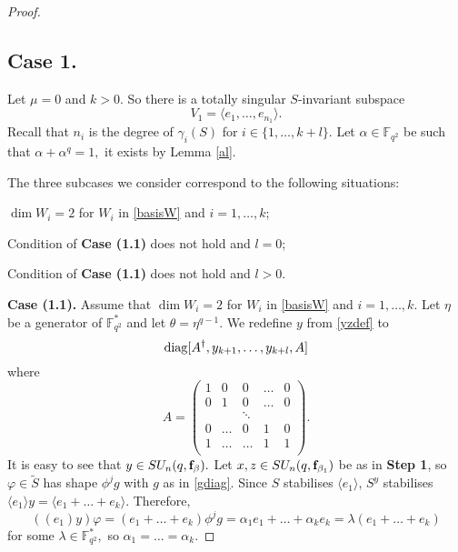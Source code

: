 \begin{proof}
\subsection*{Case 1.} Let $\mu=0$  and $k>0.$ So there is a totally singular $S$-invariant subspace 
$$V_1=\langle e_1, \ldots, e_{n_1} \rangle.$$
Recall that $n_i$ is the degree of $\gamma_i(S)$ for $i \in \{1, \ldots, k+l\}.$ Let $\alpha \in \mathbb{F}_{q^2}$ be such that  
$\alpha+\alpha^q=1,$ it exists by Lemma \ref{al}.

\medskip


The three subcases we consider correspond to the following situations:
\begin{description}[before={\renewcommand\makelabel[1]{\bfseries ##1}}]
\item[{\bf Case (1.1)}] $\dim W_i=2$ for $W_i$ in \eqref{basisW} and $i=1, \ldots, k$;
\item[{\bf Case (1.2)}] Condition of {\bf Case (1.1)} does not hold and $l=0$;
\item[{\bf Case (1.3)}] Condition of {\bf Case (1.1)} does not hold and $l>0$.
\end{description} 

\medskip

{\bf Case (1.1).} Assume that  $\dim W_i=2$ for $W_i$ in \eqref{basisW} and $i=1, \ldots, k.$
Let $\eta$ be a generator of $\mathbb{F}_{q^2}^*$ and let $\theta=\eta^{q-1}.$ We redefine $y$ from \eqref{yzdef} to $$\mathrm{diag}[A^{\dagger}, y_{k+1}, \ldots, y_{k+l},A]$$
where 
$$
A=
\begin{pmatrix}
1 & 0   & 0   & \ldots  & 0 \\
0 & 1      & 0   & \ldots  & 0 \\
  &        & \ddots &   &  \\
0 & \ldots & 0      & 1 & 0\\
1 & \ldots & \ldots & 1 & 1\\
\end{pmatrix}.
$$ It is easy to see that $y \in SU_n(q, {\bf f}_{\beta}).$ Let $x,z \in SU_n(q, {\bf f}_{\beta_1})$ be as in {\bf Step 1}, so $\varphi \in \tilde{S}$ has shape $\phi^j g$ with $g$ as in \eqref{gdiag}. Since $S$ stabilises $\langle e_1 \rangle$, $S^y$ stabilises $\langle e_1 \rangle y= \langle e_1 + \ldots +e_k \rangle.$ Therefore,
$$((e_1)y)\varphi=(e_1 + \ldots + e_k)\phi^j g=\alpha_1 e_1 + \ldots + \alpha_k e_k= \lambda (e_1 + \ldots + e_k)$$  
for some $\lambda \in \mathbb{F}_{q^2}^*,$ so $\alpha_1 = \ldots = \alpha_k.$


\end{proof}
